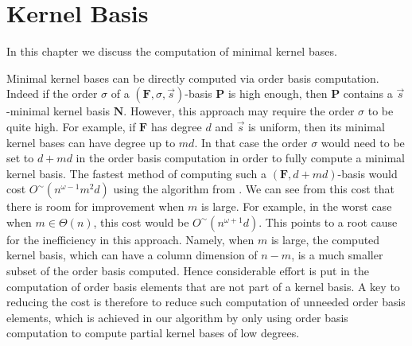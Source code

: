 
\chapter{Kernel Basis\label{chap:NullspaceBasis}}

In this chapter we discuss the computation of minimal kernel bases.

Minimal kernel bases can be directly computed via order basis computation.
Indeed if the order $\sigma$ of a $\left(\mathbf{F},\sigma,\vec{s}\right)$-basis
$\mathbf{P}$ is high enough, then $\mathbf{P}$ contains a $\vec{s}$-minimal
kernel basis $\mathbf{N}$. However, this approach may require the
order $\sigma$ to be quite high. For example, if $\mathbf{F}$ has
degree $d$ and $\vec{s}$ is uniform, then its minimal kernel bases
can have degree up to $md$. In that case the order $\sigma$ would
need to be set to $d+md$ in the order basis computation in order
to fully compute a minimal kernel basis. The fastest method of computing
such a $\left(\mathbf{F},d+md\right)$-basis would cost $O^{\sim}\left(n^{\omega-1}m^{2}d\right)$
using the algorithm from . We can see from this
cost that there is room for improvement when $m$ is large. For example,
in the worst case when $m\in\Theta\left(n\right)$, this cost would
be $O^{\sim}\left(n^{\omega+1}d\right)$. This points to a root cause
for the inefficiency in this approach. Namely, when $m$ is large,
the computed kernel basis, which can have a column dimension of $n-m$,
is a much smaller subset of the order basis computed. Hence considerable
effort is put in the computation of order basis elements that are
not part of a kernel basis. A key to reducing the cost is therefore
to reduce such computation of unneeded order basis elements, which
is achieved in our algorithm by only using order basis computation
to compute partial kernel bases of low degrees.


